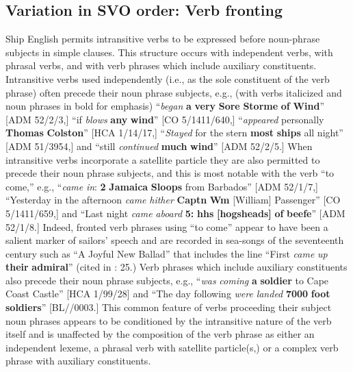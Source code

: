 \subsection{\textbf{Variation} \textbf{in} \textbf{SVO} \textbf{order:} \textbf{Verb} \textbf{fronting}}%

  Ship English permits intransitive verbs to be expressed before noun-phrase subjects in simple clauses. This structure occurs with independent verbs, with phrasal verbs, and with verb phrases which include auxiliary constituents. Intransitive verbs used independently (i.e., as the sole constituent of the verb phrase) often precede their noun phrase subjects, e.g., (with verbs italicized and noun phrases in bold for emphasis) “\textit{began} \textbf{a} \textbf{very} \textbf{Sore} \textbf{Storme} \textbf{of} \textbf{Wind}” [ADM 52/2/3,] “if \textit{blows} \textbf{any} \textbf{wind}” [CO 5/1411/640,] “\textit{appeared} personally \textbf{Thomas} \textbf{Colston}” [HCA 1/14/17,] “\textit{Stayed} for the stern \textbf{most} \textbf{ships} all night” [ADM 51/3954,] and “still \textit{continued} \textbf{much} \textbf{wind}” [ADM 52/2/5.] When intransitive verbs incorporate a satellite particle they are also permitted to precede their noun phrase subjects, and this is most notable with the verb “to come,” e.g., “\textit{came} \textit{in}: \textbf{2} \textbf{Jamaica} \textbf{Sloops} from Barbados” [ADM 52/1/7,] “Yesterday in the afternoon \textit{came} \textit{hither} \textbf{Captn} \textbf{Wm} [William] Passenger” [CO 5/1411/659,] and “Last night \textit{came} \textit{aboard} \textbf{5:} \textbf{hhs} \textbf{[hogsheads]} \textbf{of} \textbf{beefe}” [ADM 52/1/8.] Indeed, fronted verb phrases using “to come” appear to have been a salient marker of sailors’ speech and are recorded in sea-songs of the seventeenth century such as “A Joyful New Ballad” that includes the line “First \textit{came} \textit{up} \textbf{their} \textbf{admiral}” (cited in \citealt{Palmer1986}: 25.) Verb phrases which include auxiliary constituents also precede their noun phrase subjects, e.g., “\textit{was} \textit{coming} \textbf{a} \textbf{soldier} to Cape Coast Castle” [HCA 1/99/28] and “The day following \textit{were} \textit{landed} \textbf{7000} \textbf{foot} \textbf{soldiers}” [BL/\citealt{Egerton2395}/0003.] This common feature of verbs proceeding their subject noun phrases appears to be conditioned by the intransitive nature of the verb itself and is unaffected by the composition of the verb phrase as either an independent lexeme, a phrasal verb with satellite particle(s,) or a complex verb phrase with auxiliary constituents. 

